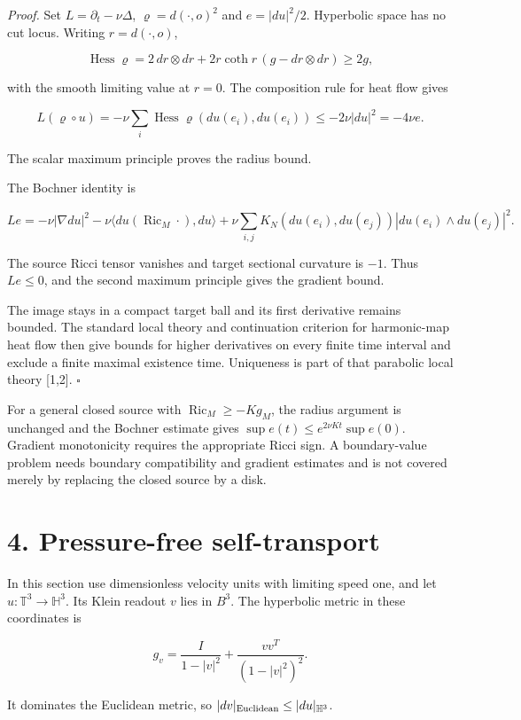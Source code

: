 \documentclass[
  11pt,
  a4paper,
]{article}
\begin{document}
\emph{Proof.} Set \(L=\partial_t-\nu\Delta\), \(\varrho=d(\cdot,o)^2\) and \(e=|du|^2/2\). Hyperbolic space has no cut locus. Writing \(r=d(\cdot,o)\),

\[
\operatorname{Hess}\varrho
=2\,dr\otimes dr+2r\coth r\,(g-dr\otimes dr)\geq2g,
\]

with the smooth limiting value at \(r=0\). The composition rule for heat flow gives

\[
L(\varrho\circ u)
=-\nu\sum_i\operatorname{Hess}\varrho(du(e_i),du(e_i))
\leq-2\nu|du|^2=-4\nu e.
\]

The scalar maximum principle proves the radius bound.

The Bochner identity is

\[
Le=-\nu|\nabla du|^2
-\nu\langle du(\operatorname{Ric}_M\cdot),du\rangle
+\nu\sum_{i,j}K_N(du(e_i),du(e_j))
|du(e_i)\wedge du(e_j)|^2.
\]

The source Ricci tensor vanishes and target sectional curvature is \(-1\). Thus \(Le\leq0\), and the second maximum principle gives the gradient bound.

The image stays in a compact target ball and its first derivative remains bounded. The standard local theory and continuation criterion for harmonic-map heat flow then give bounds for higher derivatives on every finite time interval and exclude a finite maximal existence time. Uniqueness is part of that parabolic local theory {[}1,2{]}. \(\square\)

For a general closed source with \(\operatorname{Ric}_M\geq-Kg_M\), the radius argument is unchanged and the Bochner estimate gives \(\sup e(t)\leq e^{2\nu Kt}\sup e(0)\). Gradient monotonicity requires the appropriate Ricci sign. A boundary-value problem needs boundary compatibility and gradient estimates and is not covered merely by replacing the closed source by a disk.

\section{4. Pressure-free self-transport}\label{pressure-free-self-transport}

In this section use dimensionless velocity units with limiting speed one, and let \(u:\mathbb T^3\to\mathbb H^3\). Its Klein readout \(v\) lies in \(B^3\). The hyperbolic metric in these coordinates is

\[
g_v=\frac{I}{1-|v|^2}+\frac{vv^T}{(1-|v|^2)^2}.
\]

It dominates the Euclidean metric, so \(|dv|_{\rm Euclidean}\leq|du|_{\mathbb H^3}\).
\end{document}
